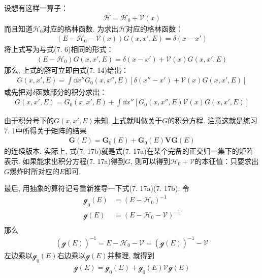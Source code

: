 设想有这样一算子：
\begin{align*}
\mathscr{H = H}_0 + \mathscr{V}(x)
\end{align*}
而且知道$\mathscr{H}_0$对应的格林函数. 
为求出$\mathscr{H}$对应的格林函数：
\begin{align}
(E - \mathscr{H}_0 - \mathscr{V}(x))G(x,x',E) = \delta(x-x')
\end{align}
将上式写为与式(7.
6)相同的形式：
\begin{align*}
(E - \mathscr{H}_0) G(x,x',E) = \delta(x-x') + \mathscr{V}(x)G(x,x',E)
\end{align*}
那么, 
上式的解可立即由式(7.
14)给出：
\begin{align*}
G(x,x',E) = \int\dd x'' G_0(x,x'',E) [ \delta(x''-x') + \mathscr{V}(x)G(x,x',E) ]
\end{align*}
或先把对$\delta$函数部分的积分求出：
\begin{align}
G(x,x',E) = G_0(x,x',E) + \int\dd x'' [G_0(x,x'',E) \mathscr{V}(x)G(x,x',E) ]\tag{7.17a}
\end{align}
\addtocounter{equation}{1}
由于积分号下的$G(x,x',E)$未知, 
上式就叫做关于$G$的积分方程. 
注意这就是练习7.
1中所得关于矩阵的结果
\begin{align}
\mathbf{G}(E) = \mathbf{G}_0(E) + \mathbf{G}_0(E)\mathbf{VG}(E)\tag{7.17b}
\end{align}
的连续版本. 
实际上, 
式(7.
17b)就是式(7.
17a)在某个完备的正交归一集下的矩阵表示. 
如果能求出积分方程(7.
17a)得到$G$, 
则可以得到$\mathscr{H}_0 + \mathscr{V}$的本征值：只要求出$G$爆炸时所对应的$E$即可.


最后, 
用抽象的算符记号重新推导一下式(7.
17a)(7.
17b). 
令
\begin{align*}
\mathscr{g}_0(E) & = (E-\mathscr{H}_0)^{-1}\\
\mathscr{g}(E)   & = (E-\mathscr{H}_0 - \mathscr{V})^{-1}\\
\end{align*}
那么
\begin{align}
( \mathscr{g}(E) )^{-1} = E - \mathscr{H}_0 - \mathscr{V} = (\mathscr{g}(E))^{-1} - \mathscr{V} 
\end{align}
左边乘以$\mathscr{g}_0(E)$右边乘以$\mathscr{g}(E)$并整理, 
就得到
\begin{align}
\mathscr{g}(E) = \mathscr{g}_0(E) + \mathscr{g}_0(E)\mathscr{V}\mathscr{g}(E) 
\end{align}

